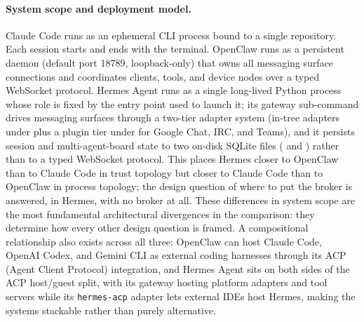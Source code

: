 \paragraph{System scope and deployment model.}
Claude Code runs as an ephemeral CLI process bound to a single repository. Each session starts and ends with the terminal. OpenClaw runs as a persistent daemon (default port 18789, loopback-only) that owns all messaging surface connections and coordinates clients, tools, and device nodes over a typed WebSocket protocol. Hermes Agent runs as a single long-lived Python process whose role is fixed by the entry point used to launch it; its gateway sub-command drives messaging surfaces through a two-tier adapter system (in-tree adapters under  plus a plugin tier under  for Google Chat, IRC, and Teams), and it persists session and multi-agent-board state to two on-disk SQLite files ( and ) rather than to a typed WebSocket protocol. This places Hermes closer to OpenClaw than to Claude Code in trust topology but closer to Claude Code than to OpenClaw in process topology; the design question of where to put the broker is answered, in Hermes, with no broker at all. These differences in system scope are the most fundamental architectural divergences in the comparison: they determine how every other design question is framed. A compositional relationship also exists across all three: OpenClaw can host Claude Code, OpenAI Codex, and Gemini CLI as external coding harnesses through its ACP (Agent Client Protocol) integration, and Hermes Agent sits on both sides of the ACP host/guest split, with its gateway hosting platform adapters and tool servers while its \texttt{hermes-acp} adapter lets external IDEs host Hermes, making the systems stackable rather than purely alternative.

